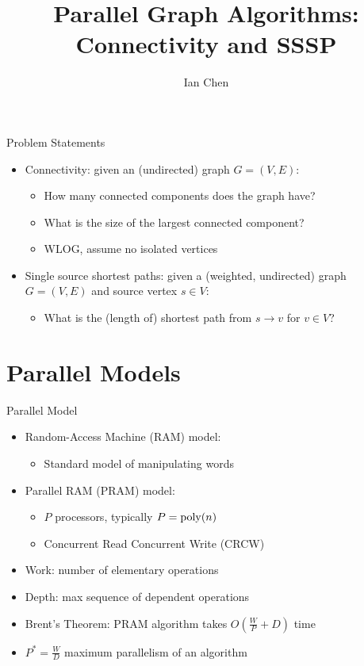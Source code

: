 \documentclass[aspectratio=169]{beamer}
\title{Parallel Graph Algorithms: Connectivity and SSSP}
\author{Ian Chen}
\date{}
\institute{University of Illinois Urbana-Champaign}
\newcommand{\pauseitem}{\onslide<+-> \item}
\begin{document}
\begin{frame}
    \titlepage
\end{frame}

\begin{frame}{Problem Statements}
    \begin{itemize}
        \pauseitem Connectivity: given an (undirected) graph $G = (V, E)$:
        \begin{itemize}
            \pauseitem How many connected components does the graph have?
            \pauseitem What is the size of the largest connected component?
            \pauseitem WLOG, assume no isolated vertices
        \end{itemize}
        \pauseitem Single source shortest paths: given a (weighted, undirected) graph $G = (V, E)$ and source vertex $s \in V$:
        \begin{itemize}
            \pauseitem What is the (length of) shortest path from $s \to v$ for $v \in V$?
        \end{itemize}
    \end{itemize}
\end{frame}

\frame{\tableofcontents}

\section{Parallel Models}
\frame{\tableofcontents[currentsection]}

\begin{frame}{Parallel Model}
    \begin{itemize}
        \pauseitem Random-Access Machine (RAM) model:
        \begin{itemize}
            \pauseitem Standard model of manipulating words
        \end{itemize}
        \pauseitem Parallel RAM (PRAM) model:
        \begin{itemize}
            \pauseitem $P$ processors, typically $P = \operatorname{poly}(n)$
            \pauseitem Concurrent Read Concurrent Write (CRCW)
        \end{itemize}
        \pauseitem Work: number of elementary operations
        \pauseitem Depth: max sequence of dependent operations
        \pauseitem Brent's Theorem: PRAM algorithm takes $O(\frac{W}{P} + D)$ time
        \pauseitem $P^* = \frac{W}{D}$ maximum parallelism of an algorithm
    \end{itemize}
\end{frame}
\end{document}
